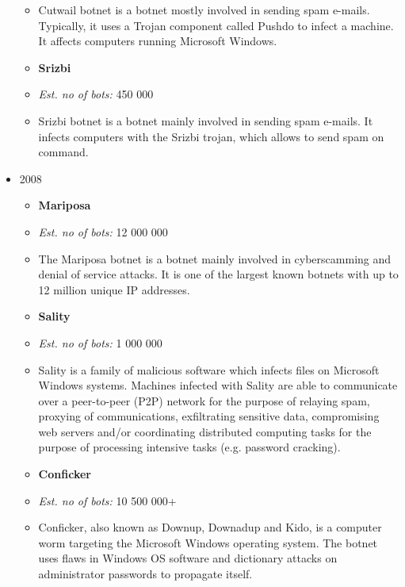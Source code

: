 \documentclass[]{article}
\begin{document}
\begin{itemize}
{\begin{itemize}
\item Cutwail botnet is a botnet mostly involved in sending spam e-mails. Typically, it uses a Trojan component called Pushdo to infect a machine. It affects computers running Microsoft Windows.

\item \textbf{Srizbi} \cite{website:srizbi}

\item \textit{Est. no of bots:} 450 000

\item Srizbi botnet is a botnet mainly involved in sending spam e-mails. It infects computers with the Srizbi trojan, which allows to send spam on command.
\end{itemize}
}

	\item {2008
\begin{itemize}
	\item \textbf{Mariposa} \cite{website:mariposa}

\item \textit{Est. no of bots:} 12 000 000

\item The Mariposa botnet is a botnet mainly involved in cyberscamming and denial of service attacks. It is one of the largest known botnets with up to 12 million unique IP addresses.

\item \textbf{Sality} \cite{website:sality}

\item \textit{Est. no of bots:} 1 000 000

\item Sality is a family of malicious software which infects files on Microsoft Windows systems. Machines infected with Sality are able to communicate over a peer-to-peer (P2P) network for the purpose of relaying spam, proxying of communications, exfiltrating sensitive data, compromising web servers and/or coordinating distributed computing tasks for the purpose of processing intensive tasks (e.g. password cracking).

\item \textbf{Conficker} \cite{website:conficker}

\item \textit{Est. no of bots:} 10 500 000+

\item Conficker, also known as Downup, Downadup and Kido, is a computer worm targeting the Microsoft Windows operating system. The botnet uses flaws in Windows OS software and dictionary attacks on administrator passwords to propagate itself.


\end{itemize}}
\end{itemize}
\end{document}

